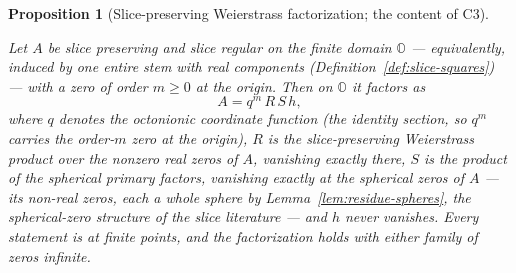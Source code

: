 \documentclass[11pt]{article}
\newcommand{\OO}{\mathbb{O}}
\providecommand{\lean}[1]{}
\providecommand{\uses}[1]{}
\theoremstyle{plain}
\newtheorem{proposition}[theorem]{Proposition}
\theoremstyle{definition}
\theoremstyle{remark}
\begin{document}
\begin{proposition}[Slice-preserving Weierstrass factorization; the content of C3]\label{prop:weierstrass}
\lean{weierstrassE, spherePrimary, ASection.c3_multipliable,
ASection.c3_locMajorant, ASection.c3_factorization,
weierstrassE_eq_zero_iff, spherePrimary_ne_zero,
spherePrimary_self_eq_zero, ASection.stem_zero_of_sphereZero,
ASection.sphereZero_complete, ASection.stem_local_form}
\uses{def:R, def:slice-squares, lem:residue-spheres}
Let $A$ be slice preserving and slice regular on the finite domain $\OO$
--- equivalently, induced by one entire stem with real components
(Definition~\ref{def:slice-squares}) --- with a zero of order $m\ge0$ at
the origin. Then on $\OO$ it factors as
\[
  A=q^{m}\,R\,S\,h,
\]
where $q$ denotes the octonionic coordinate function \textup{(}the
identity section, so $q^m$ carries the order-$m$ zero at the
origin\textup{)}, $R$ is the slice-preserving Weierstrass product over the
nonzero real zeros of $A$, vanishing exactly there, $S$ is the product of
the spherical primary factors, vanishing exactly at the \emph{spherical
zeros} of $A$ --- its non-real zeros, each a whole sphere by
Lemma~\ref{lem:residue-spheres}, the spherical-zero structure of the
slice literature \cite{AdF} --- and $h$ never vanishes. Every statement
is at finite points, and the factorization holds with either family of
zeros infinite.
\end{proposition}
\end{document}
